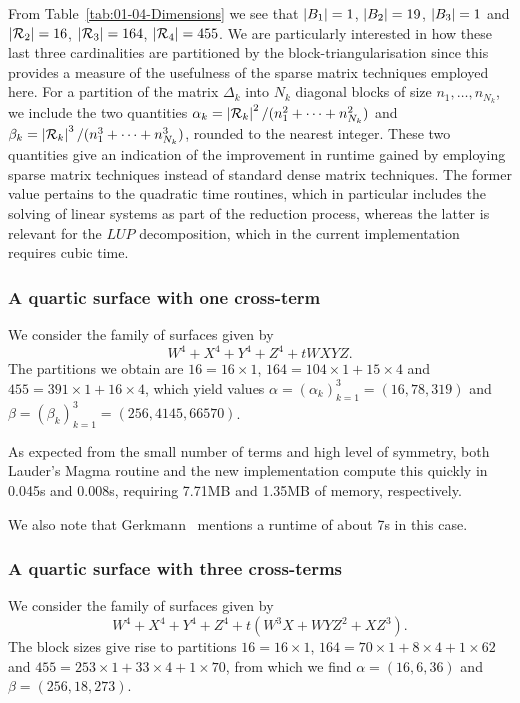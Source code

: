 From Table~\ref{tab:01-04-Dimensions} we see that $\left\lvert B_1\right\rvert = 1$, 
$\left\lvert B_2\right\rvert = 19$, $\left\lvert B_3\right\rvert = 1$ and $\left\lvert\mathcal{R}_2\right\rvert = 16$, 
$\left\lvert\mathcal{R}_3\right\rvert = 164$, $\left\lvert\mathcal{R}_4\right\rvert = 455$.  We are particularly interested in 
how these last three cardinalities are partitioned by the 
block-triangularisation since this provides a measure of the usefulness of the 
sparse matrix techniques employed here.  For a partition of the matrix 
$\Delta_k$ into $N_k$ diagonal blocks of size $n_1, \dotsc, n_{N_k}$, we 
include the two quantities 
$\alpha_k = \left\lvert\mathcal{R}_k\right\rvert^2 / (n_1^2 + \dotsb + n_{N_k}^2)$ and 
$\beta_k = \left\lvert\mathcal{R}_k\right\rvert^3 / (n_1^3 + \dotsb + n_{N_k}^3)$, rounded to the 
nearest integer.  These two quantities give an indication of the improvement 
in runtime gained by employing sparse matrix techniques instead of standard 
dense matrix techniques.  The former value pertains to the quadratic time 
routines, which in particular includes the solving of linear systems as part 
of the reduction process, whereas the latter is relevant for the $LUP$ 
decomposition, which in the current implementation requires cubic time.

\subsubsection{A quartic surface with one cross-term}

We consider the family of surfaces given by 
\begin{equation*}
W^4 + X^4 + Y^4 + Z^4 + t W X Y Z.
\end{equation*}
The partitions we obtain are $16 = 16 \times 1$, 
$164 = 104 \times 1 + 15 \times 4$ and $455 = 391 \times 1 + 16 \times 4$, 
which yield values $\alpha = (\alpha_k)_{k=1}^3 = (16,78,319)$ and 
$\beta = (\beta_k)_{k=1}^3 = (256,4145,66570)$.

As expected from the small number of terms and high level of symmetry, both 
Lauder's {\sc Magma} routine and the new implementation compute this quickly 
in 0.045s and 0.008s, requiring 7.71MB and 1.35MB of memory, respectively.

We also note that Gerkmann~\citep[\S 7.5]{Gerkmann2007} mentions a runtime of 
about 7s in this case.

\subsubsection{A quartic surface with three cross-terms}

We consider the family of surfaces given by 
\begin{equation*}
W^4 + X^4 + Y^4 + Z^4 + t (W^3 X + W Y Z^2 + X Z^3).
\end{equation*}
The block sizes give rise to partitions $16 = 16 \times 1$, 
$164 = 70 \times 1 + 8 \times 4 + 1 \times 62$ and 
$455 = 253 \times 1 + 33 \times 4 + 1 \times 70$, from which we find 
$\alpha = (16,6,36)$ and $\beta = (256,18,273)$.

